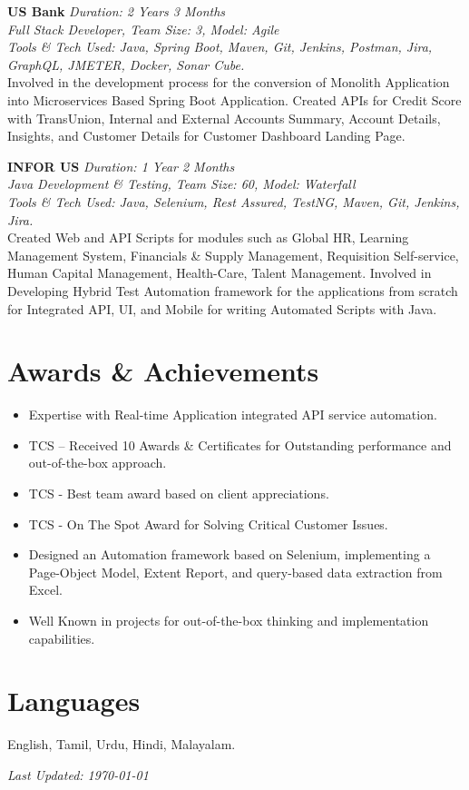 \documentclass[a4paper,10pt]{article}
\begin{document}
\textbf{US Bank} \hfill \textit{Duration: 2 Years 3 Months} \\
\textit{Full Stack Developer, Team Size: 3, Model: Agile} \\
\textit{Tools \& Tech Used: Java, Spring Boot, Maven, Git, Jenkins, Postman, Jira, GraphQL, JMETER, Docker, Sonar Cube.} \\
Involved in the development process for the conversion of Monolith Application into Microservices Based Spring Boot Application. Created APIs for Credit Score with TransUnion, Internal and External Accounts Summary, Account Details, Insights, and Customer Details for Customer Dashboard Landing Page.

\textbf{INFOR US} \hfill \textit{Duration: 1 Year 2 Months} \\
\textit{Java Development \& Testing, Team Size: 60, Model: Waterfall} \\
\textit{Tools \& Tech Used: Java, Selenium, Rest Assured, TestNG, Maven, Git, Jenkins, Jira.} \\
Created Web and API Scripts for modules such as Global HR, Learning Management System, Financials \& Supply Management, Requisition Self-service, Human Capital Management, Health-Care, Talent Management. Involved in Developing Hybrid Test Automation framework for the applications from scratch for Integrated API, UI, and Mobile for writing Automated Scripts with Java.

\section*{Awards \& Achievements}
\begin{itemize}
    \item Expertise with Real-time Application integrated API service automation.
    \item TCS – Received 10 Awards \& Certificates for Outstanding performance and out-of-the-box approach.
    \item TCS - Best team award based on client appreciations.
    \item TCS - On The Spot Award for Solving Critical Customer Issues.
    \item Designed an Automation framework based on Selenium, implementing a Page-Object Model, Extent Report, and query-based data extraction from Excel.
    \item Well Known in projects for out-of-the-box thinking and implementation capabilities.
\end{itemize}

\section*{Languages}
English, Tamil, Urdu, Hindi, Malayalam.

\begin{center} 
    \textit{Last Updated: \today}
\end{center}
\end{document}
